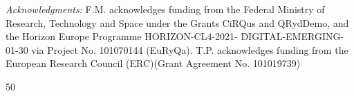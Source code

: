 \documentclass[aps,prl,groupedaddress,superscriptaddress,twocolumn,10pt,longbibliography]{revtex4-2}
\begin{document}
\textit{Acknowledgments:} F.M. acknowledges funding
from the Federal Ministry of Research, Technology and
Space under the Grants CiRQus and QRydDemo, and
the Horizon Europe Programme HORIZON-CL4-2021-
DIGITAL-EMERGING-01-30 via Project No. 101070144
(EuRyQa).  T.P. acknowledges funding from the European Research Council (ERC)(Grant Agreement No. 101019739)





\begin{thebibliography}{50}
\makeatletter
\providecommand \@ifxundefined [1]{
 \@ifx{#1\undefined}
}
\providecommand \@ifnum [1]{
 \ifnum #1\expandafter \@firstoftwo
 \else \expandafter \@secondoftwo
 \fi
}
\providecommand \@ifx [1]{
 \ifx #1\expandafter \@firstoftwo
 \else \expandafter \@secondoftwo
 \fi
}
\providecommand \natexlab [1]{#1}
\providecommand \enquote  [1]{``#1''}
\providecommand \bibnamefont  [1]{#1}
\providecommand \bibfnamefont [1]{#1}
\providecommand \citenamefont [1]{#1}
\providecommand \href@noop [0]{\@secondoftwo}
\providecommand \href [0]{\begingroup \@sanitize@url \@href}
\providecommand \@href[1]{\@@startlink{#1}\@@href}
\providecommand \@@href[1]{\endgroup#1\@@endlink}
\providecommand \@sanitize@url [0]{\catcode `\\12\catcode `\$12\catcode `\&12\catcode `\#12\catcode `\^12\catcode `\_12\catcode `\%12\relax}
\providecommand \@@startlink[1]{}
\providecommand \@@endlink[0]{}
\providecommand \url  [0]{\begingroup\@sanitize@url \@url }
\providecommand \@url [1]{\endgroup\@href {#1}{\urlprefix }}
\providecommand \urlprefix  [0]{URL }
\providecommand \Eprint [0]{\href }
\providecommand \doibase [0]{https://doi.org/}
\providecommand \selectlanguage [0]{\@gobble}
\providecommand \bibinfo  [0]{\@secondoftwo}
\providecommand \bibfield  [0]{\@secondoftwo}
\providecommand \translation [1]{[#1]}
\providecommand \BibitemOpen [0]{}
\providecommand \bibitemStop [0]{}
\providecommand \bibitemNoStop [0]{.\EOS\space}
\providecommand \EOS [0]{\spacefactor3000\relax}
\providecommand \BibitemShut  [1]{\csname bibitem#1\endcsname}
\let\auto@bib@innerbib\@empty


\end{thebibliography}
\end{document}
